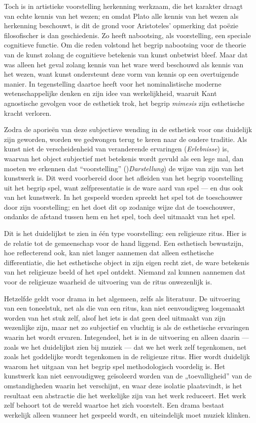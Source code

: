Toch is in artistieke voorstelling herkenning werkzaam, die het karakter draagt van echte kennis van het wezen; en omdat Plato alle kennis van het wezen als herkenning beschouwt, is dit de grond voor Aristoteles’ opmerking dat poëzie filosofischer is dan geschiedenis. Zo heeft nabootsing, als voorstelling, een speciale cognitieve functie. Om die reden volstond het begrip nabootsing voor de theorie van de kunst zolang de cognitieve betekenis van kunst onbetwist bleef. Maar dat was alleen het geval zolang kennis van het ware werd beschouwd als kennis van het wezen, want kunst ondersteunt deze vorm van kennis op een overtuigende manier. In tegenstelling daartoe heeft voor het nominalistische moderne wetenschappelijke denken en zijn idee van werkelijkheid, waaruit Kant agnostische gevolgen voor de esthetiek trok, het begrip \textit{mimesis} zijn esthetische kracht verloren.

Zodra de aporieën van deze subjectieve wending in de esthetiek voor ons duidelijk zijn geworden, worden we gedwongen terug te keren naar de oudere traditie. Als kunst niet de verscheidenheid van veranderende ervaringen (\textit{Erlebnisse}) is, waarvan het object subjectief met betekenis wordt gevuld als een lege mal, dan moeten we erkennen dat ``voorstelling'' ()\textit{Darstellung}) de wijze van zijn van het kunstwerk is. Dit werd voorbereid door het afleiden van het begrip voorstelling uit het begrip spel, want zelfpresentatie is de ware aard van spel — en dus ook van het kunstwerk. In het gespeeld worden spreekt het spel tot de toeschouwer door zijn voorstelling; en het doet dit op zodanige wijze dat de toeschouwer, ondanks de afstand tussen hem en het spel, toch deel uitmaakt van het spel.

Dit is het duidelijkst te zien in één type voorstelling: een religieuze ritus. Hier is de relatie tot de gemeenschap voor de hand liggend. Een esthetisch bewustzijn, hoe reflecterend ook, kan niet langer aannemen dat alleen esthetische differentiatie, die het esthetische object in zijn eigen recht ziet, de ware betekenis van het religieuze beeld of het spel ontdekt. Niemand zal kunnen aannemen dat voor de religieuze waarheid de uitvoering van de ritus onwezenlijk is.

Hetzelfde geldt voor drama in het algemeen, zelfs als literatuur. De uitvoering van een toneelstuk, net als die van een ritus, kan niet eenvoudigweg losgemaakt worden van het stuk zelf, alsof het iets is dat geen deel uitmaakt van zijn wezenlijke zijn, maar net zo subjectief en vluchtig is als de esthetische ervaringen waarin het wordt ervaren. Integendeel, het is in de uitvoering en alleen daarin — zoals we het duidelijkst zien bij muziek — dat we het werk zelf tegenkomen, net zoals het goddelijke wordt tegenkomen in de religieuze ritus. Hier wordt duidelijk waarom het uitgaan van het begrip spel methodologisch voordelig is. Het kunstwerk kan niet eenvoudigweg geïsoleerd worden van de „toevalligheid” van de omstandigheden waarin het verschijnt, en waar deze isolatie plaatsvindt, is het resultaat een abstractie die het werkelijke zijn van het werk reduceert. Het werk zelf behoort tot de wereld waartoe het zich voorstelt. Een drama bestaat werkelijk alleen wanneer het gespeeld wordt, en uiteindelijk moet muziek klinken.


